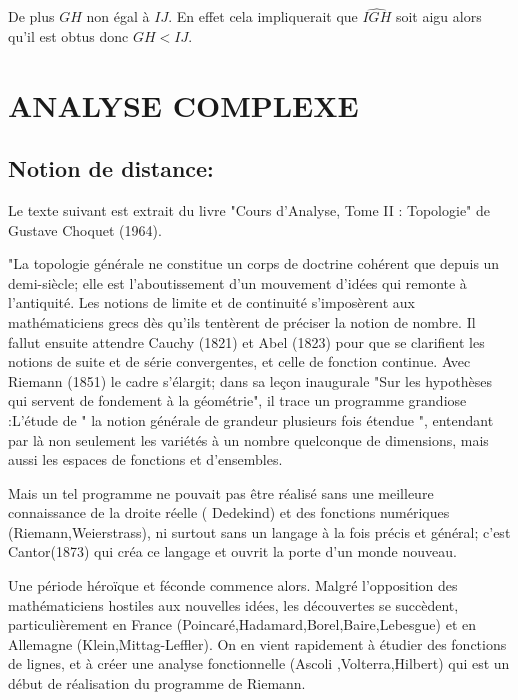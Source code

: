 \documentclass[a4paper, 12pt, twoside]{book}
\begin{document}
         De plus $GH$ non égal à $IJ$. En effet cela impliquerait que $\hat{IGH}$ soit aigu alors qu'il est obtus donc  $GH<IJ$. \\
        
      
\part{ANALYSE COMPLEXE}

















     \chapter{Notion de distance:}
        
 
 
Le texte suivant est extrait du livre
"Cours d'Analyse, Tome II : Topologie" de Gustave Choquet (1964).\


"La topologie générale ne constitue un corps de doctrine cohérent que depuis
un demi-siècle; elle est l'aboutissement d'un mouvement d'idées qui remonte à l'antiquité.
Les notions de limite et de continuité s'imposèrent aux mathématiciens grecs
dès qu'ils tentèrent de préciser la notion de nombre. Il fallut ensuite attendre Cauchy (1821) et Abel (1823) pour que se clarifient les notions de suite et de série convergentes, et celle de fonction continue. Avec Riemann (1851) le cadre s'élargit; dans sa leçon inaugurale "Sur les
hypothèses qui servent de fondement à la géométrie", il trace un programme
grandiose :L'étude de " la notion générale  de grandeur plusieurs fois  étendue ", entendant par là non seulement les variétés à un nombre quelconque de dimensions, mais aussi les espaces de fonctions et d'ensembles.\


Mais un tel programme ne pouvait pas être réalisé sans une meilleure connaissance de la droite réelle (
Dedekind) et des fonctions numériques (Riemann,Weierstrass), ni surtout sans un langage à la fois précis et général; c'est Cantor(1873) qui créa ce langage et ouvrit la porte d'un monde nouveau.\


Une période héroïque et féconde commence alors. Malgré l'opposition des mathématiciens hostiles aux nouvelles idées, les découvertes se succèdent, particulièrement en France (Poincaré,Hadamard,Borel,Baire,Lebesgue)
et en Allemagne (Klein,Mittag-Leffler). On en vient rapidement à étudier des fonctions de lignes, et à créer une analyse fonctionnelle (Ascoli
,Volterra,Hilbert) qui est un début de réalisation du programme de
Riemann.\
\end{document}
